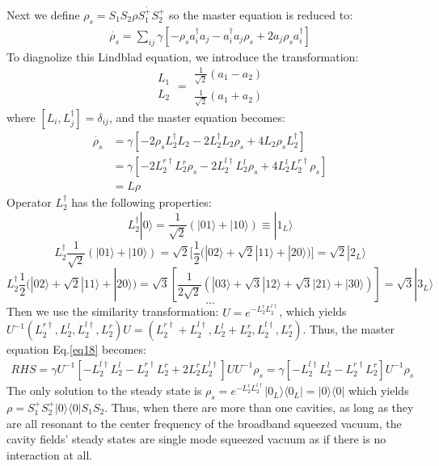 \documentclass{article}
\begin{document}
Next we define $ \rho_{s}=S_{1}S_{2}\dot{\rho S_{1}^{+}S_{2}^{+}}$ so the master equation is reduced to:
\begin{equation}
\label{eq17}
\begin{split}
\dot{\rho_{s}}=\sum_{ij}\gamma[-\rho_{s}a_{i}^{\dagger}a_{j}-a_{i}^{\dagger}a_{j}\rho_{s}+2a_{j}\rho_{s}a_{i}^{\dagger}]
\end{split}
\end{equation}
To diagnolize this Lindblad equation, we introduce the transformation: $$\begin{array}{c}
L_{1}\\
L_{2}
\end{array}=\begin{array}{c}
\frac{1}{\sqrt{2}}(a_{1}-a_{2})\\
\frac{1}{\sqrt{2}}(a_{1}+a_{2})
\end{array}$$
where $[L_{i},L_{j}^{\dagger}]=\delta_{ij}$, and the master equation becomes:
\begin{equation}
\label{eq18}
\begin{split}
\dot{\rho_{s}}&=\gamma[-2\rho_{s}L_{2}^{\dagger}L_{2}-2L_{2}^{\dagger}L_{2}\rho_{s}+4L_{2}\rho_{s}L_{2}^{\dagger}]\\
&=\gamma[-2L_{2}^{r\dagger}L_{2}^{r}\rho_{s}-2L_{2}^{l\dagger}L_{2}^{l}\rho_{s}+4L_{2}^{l}L_{2}^{r\dagger}\rho_{s}]\\
&=L\rho
\end{split}
\end{equation}
Operator $L_2^{\dagger}$ has the following properties: $$L_{2}^{\dagger}|0\rangle=\frac{1}{\sqrt{2}}(|01\rangle+|10\rangle)\equiv|1_{L}\rangle$$ $$L_{2}^{\dagger}\frac{1}{\sqrt{2}}(|01\rangle+|10\rangle)=\sqrt{2}[\frac{1}{2}(|02\rangle+\sqrt{2}|11\rangle+|20\rangle)]=\sqrt{2}|2_{L}\rangle$$  $$L_{2}^{\dagger}\frac{1}{2}(|02\rangle+\sqrt{2}|11\rangle+|20\rangle)=\sqrt{3}[\frac{1}{2\sqrt{2}}(|03\rangle+\sqrt{3}|12\rangle+\sqrt{3}|21\rangle+|30\rangle)]=\sqrt{3}|3_{L}\rangle$$  $$...$$
Then we use the similarity transformation: $U=e^{-L_2^{r}L_2^{l\dagger}}$, which yields $U^{-1}(L_{2}^{r\dagger},L_{2}^{l},L_{2}^{l\dagger},L_{2}^{r})U=(L_{2}^{r\dagger}+L_{2}^{l\dagger},L_{2}^{l}+L_{2}^{r},L_{2}^{l\dagger},L_{2}^{r}) $. Thus, the master equation Eq.\eqref{eq18} becomes:
\begin{equation}
\label{eq18}
\begin{split}
RHS=\gamma U^{-1}[-L_2^{l\dagger}L_2^{l}-L_2^{r\dagger}L_2^{r}+2L_2^{r}L_2^{l\dagger}]UU^{-1}\rho_{s}=\gamma[-L_2^{l\dagger}L_2^{l}-L_2^{r\dagger}L_2^{r}]U^{-1}\rho_{s}
\end{split}
\end{equation}
The only solution to the steady state is $\rho_{s}=e^{-L_2^{r}L_2^{l\dagger}}|0_{L}\rangle\langle0_{L}|=|0\rangle\langle0|$ which yields $\rho=S_{1}^{+}S_{2}^{+}|0\rangle\langle0|S_{1}S_{2}$. Thus, when there are more than one cavities, as long as they are all resonant to the center frequency of the broadband squeezed vacuum, the cavity fields' steady states are single mode squeezed vacuum as if there is no interaction at all.
\end{document}
